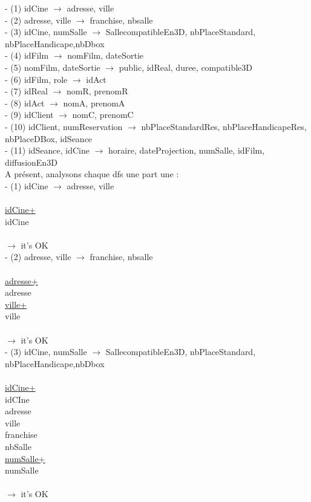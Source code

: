 \documentclass[a4paper,sffamily,12pt]{article}
\begin{document}
						\noindent- (1) idCine $\rightarrow$ adresse, ville \\
						- (2) adresse, ville $\rightarrow$ franchise, nbsalle \\
						- (3) idCine, numSalle $\rightarrow$ SallecompatibleEn3D, nbPlaceStandard, nbPlaceHandicape,nbDbox \\
				 		- (4) idFilm $\rightarrow$ nomFilm, dateSortie \\
						- (5) nomFilm, dateSortie $\rightarrow$ public, idReal, duree, compatible3D \\
						- (6) idFilm, role $\rightarrow$  idAct \\
						- (7) idReal $\rightarrow$ nomR, prenomR \\
						- (8) idAct $\rightarrow$ nomA, prenomA \\
						- (9) idClient $\rightarrow$ nomC, prenomC \\
						- (10) idClient, numReservation $\rightarrow$ nbPlaceStandardRes, nbPlaceHandicapeRes, nbPlaceDBox, idSeance \\
						- (11) idSeance, idCine $\rightarrow$ horaire, dateProjection, numSalle, idFilm, diffusionEn3D \\
						
						A présent, analysons chaque dfs une part une : \\
						
						\noindent - (1) idCine $\rightarrow$ adresse, ville \\
							\\
							\underline{idCine+} \\
							idCine\\
							\\									
						$\rightarrow$ it's OK \\		
							
						\noindent - (2) adresse, ville $\rightarrow$ franchise, nbsalle \\
							\\
							\underline{adresse+} \\
							adresse\\
							\underline{ville+} \\
							ville \\	
							\\									
						$\rightarrow$ it's OK \\
						
						\noindent - (3) idCine, numSalle $\rightarrow$ SallecompatibleEn3D, nbPlaceStandard, nbPlaceHandicape,nbDbox \\
							\\
							\underline{idCine+} \\
							idCIne\\
							adresse\\
							ville\\
							franchise\\
							nbSalle\\
							\underline{numSalle+} \\
							numSalle \\	
							\\									
						$\rightarrow$ it's OK \\													
\end{document}
